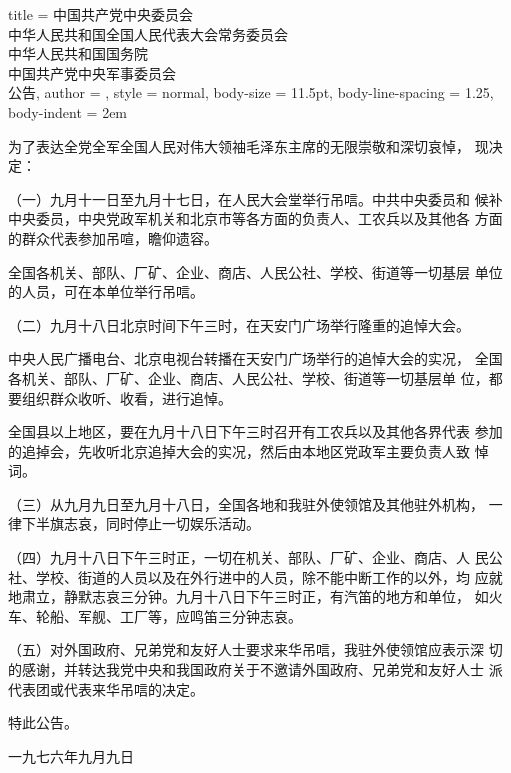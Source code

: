 \begin{hongqiarticle}{
                title  = {中国共产党中央委员会\\
                                中华人民共和国全国人民代表大会常务委员会\\
                                中华人民共和国国务院\\
                                中国共产党中央军事委员会\\
                                公告},
                author = {},
                style  = normal,
                body-size = 11.5pt,
                body-line-spacing = 1.25,
                body-indent = 2em
        }

        为了表达全党全军全国人民对伟大领袖毛泽东主席的无限崇敬和深切哀悼，
        现决定：

        （一）九月十一日至九月十七日，在人民大会堂举行吊唁。中共中央委员和
        候补中央委员，中央党政军机关和北京市等各方面的负责人、工农兵以及其他各
        方面的群众代表参加吊喧，瞻仰遗容。

        全国各机关、部队、厂矿、企业、商店、人民公社、学校、街道等一切基层
        单位的人员，可在本单位举行吊唁。

        （二）九月十八日北京时间下午三时，在天安门广场举行隆重的追悼大会。

        中央人民广播电台、北京电视台转播在天安门广场举行的追悼大会的实况，
        全国各机关、部队、厂矿、企业、商店、人民公社、学校、街道等一切基层单
        位，都要组织群众收听、收看，进行追悼。

        全国县以上地区，要在九月十八日下午三时召开有工农兵以及其他各界代表
        参加的追掉会，先收听北京追掉大会的实况，然后由本地区党政军主要负责人致
        悼词。

        （三）从九月九日至九月十八日，全国各地和我驻外使领馆及其他驻外机构，
        一律下半旗志哀，同时停止一切娱乐活动。

        （四）九月十八日下午三时正，一切在机关、部队、厂矿、企业、商店、人
        民公社、学校、街道的人员以及在外行进中的人员，除不能中断工作的以外，均
        应就地肃立，静默志哀三分钟。九月十八日下午三时正，有汽笛的地方和单位，
        如火车、轮船、军舰、工厂等，应鸣笛三分钟志哀。

        （五）对外国政府、兄弟党和友好人士要求来华吊唁，我驻外使领馆应表示深
        切的感谢，并转达我党中央和我国政府关于不邀请外国政府、兄弟党和友好人士
        派代表团或代表来华吊唁的决定。

        特此公告。

        一九七六年九月九日

\end{hongqiarticle}